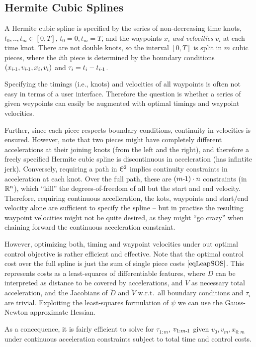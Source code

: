 \subsection{Hermite Cubic Splines}

A Hermite cubic spline is specified by the series of non-decreasing
time knots, $t_0,..,t_m \in [0,T]$, $t_0=0, t_m=T$, and the waypoints
$x_i$ \emph{and velocities} $v_i$ at each time knot. There are not
double knots, so the interval $[0,T]$ is split in $m$ cubic pieces,
where the $i$th piece is determined by the boundary conditions
$(x_{i{{\hspace*{-.0pt}\text{\rm -}\hspace*{-.5pt}}1}},v_{i{{\hspace*{-.0pt}\text{\rm -}\hspace*{-.5pt}}1}}, x_i, v_i)$ and $\tau_i = t_i - t_{i{{\hspace*{-.0pt}\text{\rm -}\hspace*{-.5pt}}1}}$.

Specifying the timings (i.e., knots) and velocities of all waypoints is often not easy in terms of a user interface. Therefore the question is whether a series of given weypoints can easily be augmented with optimal timings and waypoint velocities.

Further, since each piece respects boundary conditions, continuity in velocities is ensured. However, note that two pieces might have completely different
accelerations at their joining knots (from the left and the right), and therefore a freely specified Hermite cubic spline is discontinuous in acceleration (has infintite jerk). Conversely, requiring a path in  ${\cal C}^2$ implies continuity constraints in acceleration at each knot. Over the full path, these are $(m{{\hspace*{-.0pt}\text{\rm -}\hspace*{-.5pt}}1}) \cdot n$ constraints (in ${\mathbb{R}}^n$), which ``kill'' the degrees-of-freedom of all but the start and end velocity. Therefore, requiring continuous accelleration, the kots, waypoints and start/end velocity alone are sufficient to specify the spline -- but in practise the resulting waypoint velocities might not be quite desired, as they might ``go crazy'' when chaining forward the continuous acceleration constraint.

However, optimizing both, timing and waypoint velocities under out
optimal control objective is rather efficient and effective. Note that
the optimal control cost over the full spline is just the sum of
single piece costs $\eqref{eqLeapSOS}$. This represents costs as a
least-squares of differentiable features, where $D$ can be interpreted
as distance to be covered by accelerations, and $V$ as necessary total
acceleration, and the Jacobians of $\tilde D$ and $\tilde V$
w.r.t.\ all boundary conditions and $\tau_i$ are trivial. Exploiting
the least-squares formulation of $\psi$ we can use the Gauss-Newton
approximate Hessian.

As a concequence, it is fairly efficient to solve for $\tau_{1:m}$, $v_{1:m{{\hspace*{-.0pt}\text{\rm -}\hspace*{-.5pt}}1}}$ given $v_0, v_m, x_{0:m}$ under continuous acceleration constraints subject to total time and control costs.

